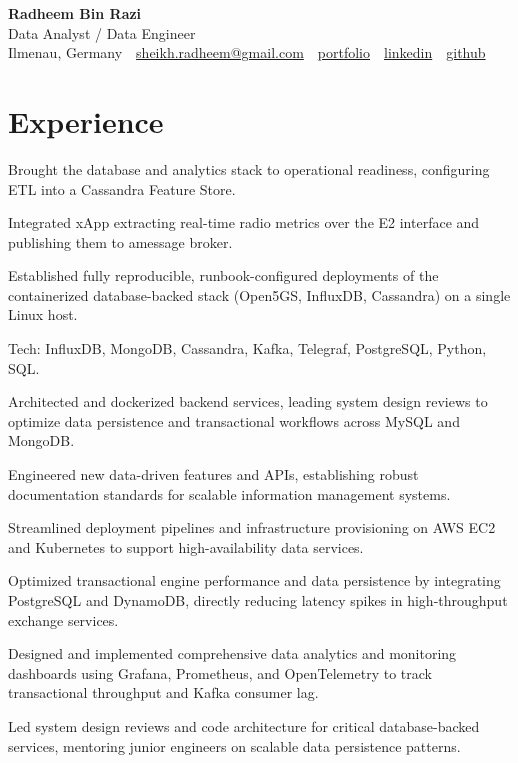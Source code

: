 \documentclass[10pt,a4paper]{resume}
\makeatletter
\newcommand{\Portfolio}{https://radheem.github.io/my-cv}
\newcommand{\PortfolioText}{portfolio}
\newcommand{\GitHub}{https://github.com/radheem}
\newcommand{\LinkedIn}{https://www.linkedin.com/in/radheem-razi}
\newcommand{\Email}{sheikh.radheem@gmail.com}
\makeatother
\begin{document}
\begin{center}
  {\huge\bfseries Radheem Bin Razi}\\[3pt]
  {\large Data Analyst / Data Engineer}\\[6pt]
  \small
  Ilmenau, Germany \,\textbar\,
  \href{mailto:\Email}{\Email} \,\textbar\,
  \href{\Portfolio}{\PortfolioText} \,\textbar\,
  \href{\LinkedIn}{linkedin} \,\textbar\,
  \href{\GitHub}{github}
\end{center}
\vspace{2pt}

\section{Experience}

\bullets
  \item Brought the database and analytics stack to operational readiness, configuring ETL into a Cassandra Feature Store.
  \item Integrated xApp extracting real-time radio metrics over the E2 interface and publishing them to amessage broker.
  \item Established fully reproducible, runbook-configured deployments of the containerized database-backed stack (Open5GS, InfluxDB, Cassandra) on a single Linux host.
  \item Tech: InfluxDB, MongoDB, Cassandra, Kafka, Telegraf, PostgreSQL, Python, SQL.
\bulletsend
\vspace{1.5pt}
\bullets
  \item Architected and dockerized backend services, leading system design reviews to optimize data persistence and transactional workflows across MySQL and MongoDB.
  \item Engineered new data-driven features and APIs, establishing robust documentation standards for scalable information management systems.
  \item Streamlined deployment pipelines and infrastructure provisioning on AWS EC2 and Kubernetes to support high-availability data services.
\bulletsend
\vspace{1.5pt}
\bullets
  \item Optimized transactional engine performance and data persistence by integrating PostgreSQL and DynamoDB, directly reducing latency spikes in high-throughput exchange services.
  \item Designed and implemented comprehensive data analytics and monitoring dashboards using Grafana, Prometheus, and OpenTelemetry to track transactional throughput and Kafka consumer lag.
  \item Led system design reviews and code architecture for critical database-backed services, mentoring junior engineers on scalable data persistence patterns.
\bulletsend
\vspace{1.5pt}
\end{document}
